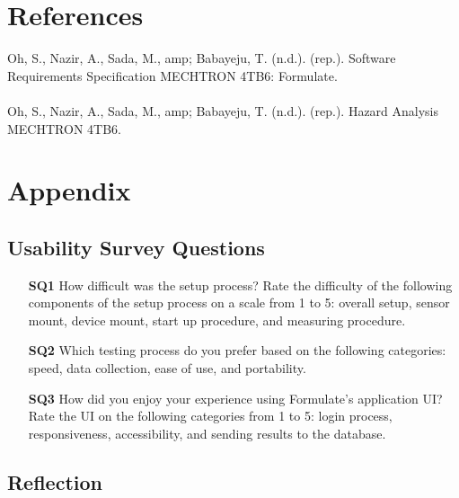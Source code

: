 \documentclass[12pt, titlepage]{article}
\begin{document}
  \newpage




				

\section{References}
Oh, S., Nazir, A., Sada, M., amp; Babayeju, T. (n.d.). (rep.). Software Requirements Specification MECHTRON 4TB6: Formulate. \\
\noindent \\
Oh, S., Nazir, A., Sada, M., amp; Babayeju, T. (n.d.). (rep.). Hazard Analysis MECHTRON 4TB6. \\

\newpage
\section{Appendix}


\subsection{Usability Survey Questions}

\begin{enumerate}
  \item[\bf{SQ1}]{How difficult was the setup process? Rate the difficulty of the following components of the setup process on a scale from 1 to 5: overall setup, sensor mount, device mount, start up procedure, and measuring procedure. }
  
  \item[\bf{SQ2}]{Which testing process do you prefer based on the following categories: speed, data collection, ease of use, and portability. }
  
  \item[\bf{SQ3}]{How did you enjoy your experience using Formulate's application UI? Rate the UI on the following categories from 1 to 5: login process, responsiveness, accessibility, and sending results to the database.}

\end{enumerate}


\subsection{Reflection}
\end{document}
